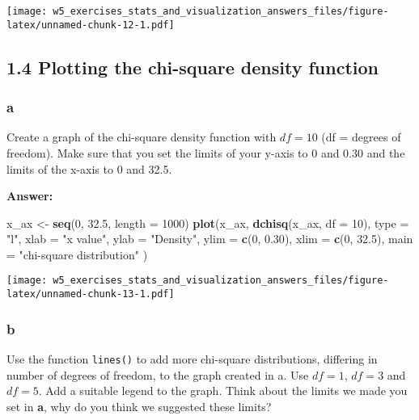 \documentclass[]{article}
\newenvironment{Shaded}{\begin{snugshade}}{\end{snugshade}}
\newcommand{\DataTypeTok}[1]{\textcolor[rgb]{0.13,0.29,0.53}{#1}}
\newcommand{\DecValTok}[1]{\textcolor[rgb]{0.00,0.00,0.81}{#1}}
\newcommand{\FloatTok}[1]{\textcolor[rgb]{0.00,0.00,0.81}{#1}}
\newcommand{\KeywordTok}[1]{\textcolor[rgb]{0.13,0.29,0.53}{\textbf{#1}}}
\newcommand{\NormalTok}[1]{#1}
\newcommand{\StringTok}[1]{\textcolor[rgb]{0.31,0.60,0.02}{#1}}
\begin{document}
\texttt{[image: w5\_exercises\_stats\_and\_visualization\_answers\_files/figure-latex/unnamed-chunk-12-1.pdf]}

\hypertarget{plotting-the-chi-square-density-function}{%
\subsection{1.4 Plotting the chi-square density
function}\label{plotting-the-chi-square-density-function}}

\hypertarget{a-3}{%
\subsubsection{a}\label{a-3}}

Create a graph of the chi-square density function with \(df = 10\) (df =
degrees of freedom). Make sure that you set the limits of your y-axis to
0 and 0.30 and the limits of the x-axis to 0 and 32.5.

\textbf{Answer:}

\begin{Shaded}
\begin{Highlighting}[]
\NormalTok{x_ax <-}\StringTok{ }\KeywordTok{seq}\NormalTok{(}\DecValTok{0}\NormalTok{, }\FloatTok{32.5}\NormalTok{, }\DataTypeTok{length =} \DecValTok{1000}\NormalTok{)}
\KeywordTok{plot}\NormalTok{(x_ax, }\KeywordTok{dchisq}\NormalTok{(x_ax, }\DataTypeTok{df =} \DecValTok{10}\NormalTok{), }
  \DataTypeTok{type =} \StringTok{"l"}\NormalTok{, }\DataTypeTok{xlab =} \StringTok{"x value"}\NormalTok{, }\DataTypeTok{ylab =} \StringTok{"Density"}\NormalTok{, }
  \DataTypeTok{ylim =} \KeywordTok{c}\NormalTok{(}\DecValTok{0}\NormalTok{, }\FloatTok{0.30}\NormalTok{), }\DataTypeTok{xlim =} \KeywordTok{c}\NormalTok{(}\DecValTok{0}\NormalTok{, }\FloatTok{32.5}\NormalTok{), }
  \DataTypeTok{main =} \StringTok{"chi-square distribution"}
\NormalTok{)}
\end{Highlighting}
\end{Shaded}

\texttt{[image: w5\_exercises\_stats\_and\_visualization\_answers\_files/figure-latex/unnamed-chunk-13-1.pdf]}

\hypertarget{b-3}{%
\subsubsection{b}\label{b-3}}

Use the function \texttt{lines()} to add more chi-square distributions,
differing in number of degrees of freedom, to the graph created in a.
Use \(df = 1\), \(df = 3\) and \(df = 5\). Add a suitable legend to the
graph. Think about the limits we made you set in \textbf{a}, why do you
think we suggested these limits?
\end{document}
